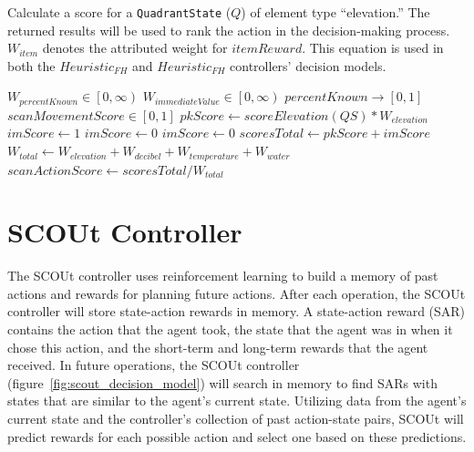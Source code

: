 \begin{algorithm}[H]
  \caption{Calculate a score for a \texttt{QuadrantState} ($Q$) of element type ``elevation.'' The returned results will be used to rank the action in the decision-making process. $W_{item}$ denotes the attributed weight for $itemReward$. This equation is used in both the $Heuristic_{FH}$ and $Heuristic_{FH}$ controllers' decision models.}
  \begin{algorithmic} \label{algorithmic:findHuman_scoreElevation}
    \REQUIRE $W_{percentKnown} \in \left[0, \infty \right)$
    \REQUIRE $W_{immediateValue} \in \left[0, \infty \right)$
    \ENSURE $percentKnown \rightarrow \left[0, 1 \right]$
    \ENSURE $scanMovementScore \in \left[0, 1 \right]$
    \STATE $pkScore \leftarrow scoreElevation(QS) * W_{elevation}$
        \STATE $imScore \leftarrow 1$
      \ELSE
        \STATE $imScore \leftarrow 0$
      \ENDIF
    \ELSE
      \STATE $imScore \leftarrow 0$
    \ENDIF
    \STATE $scoresTotal \leftarrow pkScore + imScore$
    \STATE $W_{total} \leftarrow W_{elevation} + W_{decibel} + W_{temperature} + W_{water}$
    \RETURN $scanActionScore \leftarrow scoresTotal / W_{total}$
  \end{algorithmic}
\end{algorithm}


\section{SCOUt Controller} \label{sec:scout_controller}
The SCOUt controller uses reinforcement learning to build a memory of past actions and rewards for planning future actions.
After each operation, the SCOUt controller will store state-action rewards in memory.
A state-action reward (SAR) contains the action that the agent took, the state that the agent was in when it chose this action, and the short-term and long-term rewards that the agent received.
In future operations, the SCOUt controller (figure~\ref{fig:scout_decision_model}) will search in memory to find SARs with states that are similar to the agent's current state.
Utilizing data from the agent's current state and the controller's collection of past action-state pairs, SCOUt will predict rewards for each possible action and select one based on these predictions.

